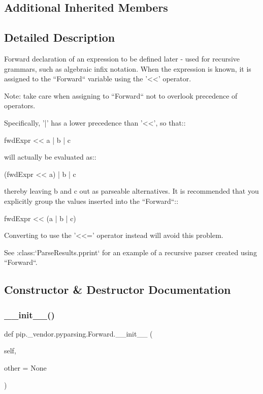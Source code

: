 \subsection*{Additional Inherited Members}


\subsection{Detailed Description}
\begin{DoxyVerb}Forward declaration of an expression to be defined later -
used for recursive grammars, such as algebraic infix notation.
When the expression is known, it is assigned to the ``Forward``
variable using the '<<' operator.

Note: take care when assigning to ``Forward`` not to overlook
precedence of operators.

Specifically, '|' has a lower precedence than '<<', so that::

    fwdExpr << a | b | c

will actually be evaluated as::

    (fwdExpr << a) | b | c

thereby leaving b and c out as parseable alternatives.  It is recommended that you
explicitly group the values inserted into the ``Forward``::

    fwdExpr << (a | b | c)

Converting to use the '<<=' operator instead will avoid this problem.

See :class:`ParseResults.pprint` for an example of a recursive
parser created using ``Forward``.
\end{DoxyVerb}
 

\subsection{Constructor \& Destructor Documentation}
\mbox{\label{classpip_1_1__vendor_1_1pyparsing_1_1Forward_a34358ba6096dfed9672834ef8569e3a6}} 
\subsubsection{\texorpdfstring{\+\_\+\+\_\+init\+\_\+\+\_\+()}{\_\_init\_\_()}}
{\footnotesize\ttfamily def pip.\+\_\+vendor.\+pyparsing.\+Forward.\+\_\+\+\_\+init\+\_\+\+\_\+ (\begin{DoxyParamCaption}\item[{}]{self,  }\item[{}]{other = {\ttfamily None} }\end{DoxyParamCaption})}



